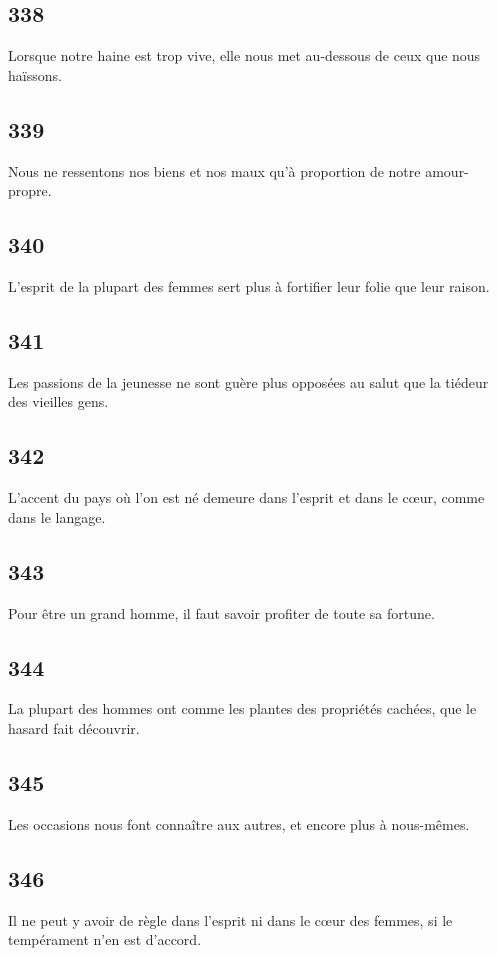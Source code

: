 \documentclass[french,twoside]{book} %
\begin{document}
\subsection[{338}]{ \textsc{338} }
\noindent Lorsque notre haine est trop vive, elle nous met au-dessous de ceux que nous haïssons.
\subsection[{339}]{ \textsc{339} }
\noindent Nous ne ressentons nos biens et nos maux qu’à proportion de notre amour-propre.
\subsection[{340}]{ \textsc{340} }
\noindent L’esprit de la plupart des femmes sert plus à fortifier leur folie que leur raison.
\subsection[{341}]{ \textsc{341} }
\noindent Les passions de la jeunesse ne sont guère plus opposées au salut que la tiédeur des vieilles gens.
\subsection[{342}]{ \textsc{342} }
\noindent L’accent du pays où l’on est né demeure dans l’esprit et dans le cœur, comme dans le langage.
\subsection[{343}]{ \textsc{343} }
\noindent Pour être un grand homme, il faut savoir profiter de toute sa fortune.
\subsection[{344}]{ \textsc{344} }
\noindent La plupart des hommes ont comme les plantes des propriétés cachées, que le hasard fait découvrir.
\subsection[{345}]{ \textsc{345} }
\noindent Les occasions nous font connaître aux autres, et encore plus à nous-mêmes.
\subsection[{346}]{ \textsc{346} }
\noindent Il ne peut y avoir de règle dans l’esprit ni dans le cœur des femmes, si le tempérament n’en est d’accord.
\end{document}
